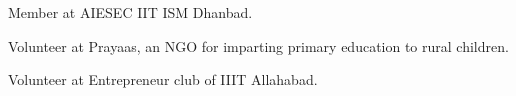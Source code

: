 

\begin{cvparagraph}
\item {Member at AIESEC IIT ISM Dhanbad.}
\item {Volunteer at Prayaas, an NGO for imparting primary education to rural children.}
\item {Volunteer at Entrepreneur club of IIIT Allahabad.}
\end{cvparagraph}

